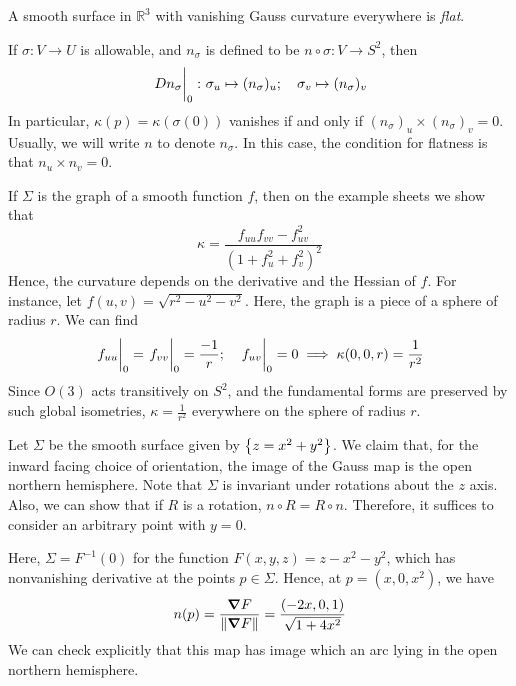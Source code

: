 \begin{definition}
	A smooth surface in \( \mathbb R^3 \) with vanishing Gauss curvature everywhere is \textit{flat}.
\end{definition}
\begin{remark}
	If \( \sigma\colon V \to U \) is allowable, and \( n_\sigma \) is defined to be \( n \circ \sigma \colon V \to S^2 \), then
	\[ \eval{Dn_\sigma}_0 \colon \sigma_u \mapsto (n_\sigma)_u;\quad \sigma_v \mapsto (n_\sigma)_v \]
	In particular, \( \kappa(p) = \kappa(\sigma(0)) \) vanishes if and only if \( (n_\sigma)_u \times (n_\sigma)_v = 0 \).
	Usually, we will write \( n \) to denote \( n_\sigma \).
	In this case, the condition for flatness is that \( n_u \times n_v = 0 \).
\end{remark}
\begin{example}
	If \( \Sigma \) is the graph of a smooth function \( f \), then on the example sheets we show that
	\[ \kappa = \frac{f_{uu} f_{vv} - f_{uv}^2}{(1+f_u^2 + f_v^2)^2} \]
	Hence, the curvature depends on the derivative and the Hessian of \( f \).
	For instance, let \( f(u,v) = \sqrt{r^2 - u^2 - v^2} \).
	Here, the graph is a piece of a sphere of radius \( r \).
	We can find
	\[ \eval{f_{uu}}_0 = \eval{f_{vv}}_0 = \frac{-1}{r};\quad \eval{f_{uv}}_0 = 0 \implies \kappa(0,0,r) = \frac{1}{r^2} \]
	Since \( O(3) \) acts transitively on \( S^2 \), and the fundamental forms are preserved by such global isometries, \( \kappa = \frac{1}{r^2} \) everywhere on the sphere of radius \( r \).
\end{example}
\begin{example}
	Let \( \Sigma \) be the smooth surface given by \( \qty{z = x^2 + y^2} \).
	We claim that, for the inward facing choice of orientation, the image of the Gauss map is the open northern hemisphere.
	Note that \( \Sigma \) is invariant under rotations about the \( z \) axis.
	Also, we can show that if \( R \) is a rotation, \( n \circ R = R \circ n \).
	Therefore, it suffices to consider an arbitrary point with \( y = 0 \).

	Here, \( \Sigma = F^{-1}(0) \) for the function \( F(x,y,z) = z - x^2 - y^2 \), which has nonvanishing derivative at the points \( p \in \Sigma \).
	Hence, at \( p = (x,0,x^2) \), we have
	\[ n(p) = \frac{\grad{F}}{\norm{\grad{F}}} = \frac{(-2x,0,1)}{\sqrt{1+4x^2}} \]
	We can check explicitly that this map has image which an arc lying in the open northern hemisphere.
\end{example}

